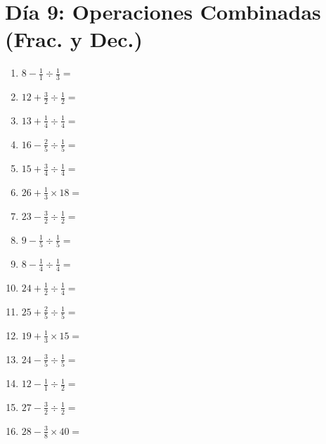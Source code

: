 \documentclass[12pt]{article}
\begin{document}
\section*{Día 9: Operaciones Combinadas (Frac. y Dec.)}
\begin{enumerate}
\item \large $ 8 - \frac{1}{1} \div \frac{1}{3} = $ \vspace{1.6cm}
\item \large $ 12 + \frac{3}{2} \div \frac{1}{2} = $ \vspace{1.6cm}
\item \large $ 13 + \frac{1}{4} \div \frac{1}{4} = $ \vspace{1.6cm}
\item \large $ 16 - \frac{2}{5} \div \frac{1}{5} = $ \vspace{1.6cm}
\item \large $ 15 + \frac{3}{4} \div \frac{1}{4} = $ \vspace{1.6cm}
\item \large $ 26 + \frac{1}{3} \times 18 = $ \vspace{1.6cm}
\item \large $ 23 - \frac{3}{2} \div \frac{1}{2} = $ \vspace{1.6cm}
\item \large $ 9 - \frac{1}{5} \div \frac{1}{5} = $ \vspace{1.6cm}
\item \large $ 8 - \frac{1}{4} \div \frac{1}{4} = $ \vspace{1.6cm}
\item \large $ 24 + \frac{1}{2} \div \frac{1}{4} = $ \vspace{1.6cm}
\newpage
\item \large $ 25 + \frac{2}{5} \div \frac{1}{5} = $ \vspace{1.6cm}
\item \large $ 19 + \frac{1}{3} \times 15 = $ \vspace{1.6cm}
\item \large $ 24 - \frac{3}{5} \div \frac{1}{5} = $ \vspace{1.6cm}
\item \large $ 12 - \frac{1}{1} \div \frac{1}{2} = $ \vspace{1.6cm}
\item \large $ 27 - \frac{3}{2} \div \frac{1}{2} = $ \vspace{1.6cm}
\item \large $ 28 - \frac{3}{8} \times 40 = $ \vspace{1.6cm}

\end{enumerate}
\end{document}
